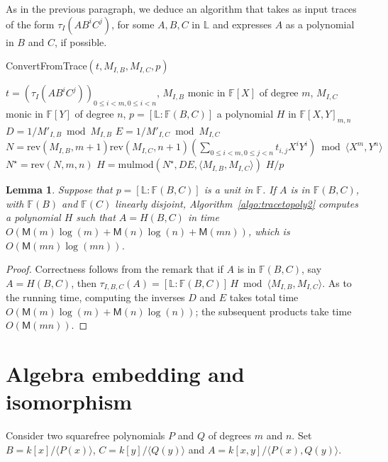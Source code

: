 \documentclass[12pt]{article}
\def\M {\ensuremath{\mathsf{M}}}
\def\F {\ensuremath{\mathbb{F}}}
\def\L {\ensuremath{\mathbb{L}}}
\def\mulmod {\ensuremath{\mathrm{mulmod}}}
\def\rev {\ensuremath{\mathrm{rev}}}
\newcommand{\ang}[1]{\langle#1\rangle}
\newtheorem{Lemma}{Lemma}
\begin{document}
As in the previous paragraph, we deduce an algorithm that takes as
input traces of the form $\tau_I(A B^i C^j)$, for some $A,B,C$ in $\L$
and expresses $A$ as a polynomial in $B$ and $C$, if possible.
\begin{algorithm}[H]
  \caption{ConvertFromTrace$(t, M_{I,B}, M_{I,C}, p)$}
  \begin{algorithmic}[1]
    \REQUIRE  $t=(\tau_I(A B^iC^j))_{0 \le i < m, 0 \le i < n}$, $M_{I,B}$ monic in $\F[X]$ of degree $m$,
    $M_{I,C}$ monic in $\F[Y]$ of degree $n$, 
    $p=[\L:\F(B,C)]$
    \ENSURE a polynomial $H$ in $\F[X,Y]_{m,n}$
    \STATE $D =  1/M'_{I,B} \bmod M_{I,B}$
    \STATE $E =  1/M'_{I,C} \bmod M_{I,C}$
    \STATE $N=\rev(M_{I,B}, m+1)\rev(M_{I,C}, n+1)( \sum_{0 \le i <m, 0 \le j < n} t_{i,j} X^iY^i) \bmod \langle X^m, Y^n \rangle$
    \STATE $N^\star = \rev(N, m, n)$
    \STATE $H=\mulmod(N^\star, D E, \langle M_{I,B}, M_{I,C} \rangle)$
    \RETURN $H/p$
  \end{algorithmic}
  \label{algo:tracetopoly2}
\end{algorithm}

\begin{Lemma}
  Suppose that $p=[\L:\F(B,C)]$ is a unit in $\F$. If $A$ is in
  $\F(B,C)$, with $\F(B)$ and $\F(C)$ linearly disjoint,
  Algorithm~\ref{algo:tracetopoly2} computes a polynomial $H$ such
  that $A=H(B,C)$ in time $O(\M(m)\log(m)+\M(n)\log(n)+\M(mn))$, which
  is $O(\M(mn)\log(mn))$.
\end{Lemma}
\begin{proof}
  Correctness follows from the remark that if $A$ is in $\F(B,C)$, say
  $A=H(B,C)$, then $\tau_{I,B,C} (A)=[\L:\F(B,C)]\, H \bmod \langle
  M_{I,B}, M_{I,C} \rangle$.  As to the running time, computing
  the inverses $D$ and $E$ takes total time $O(\M(m)\log(m)+\M(n)\log(n))$;
  the subsequent products take time $O(\M(mn))$.
\end{proof}


\section{Algebra embedding and isomorphism} 

Consider two squarefree polynomials $P$ and $Q$ of degrees $m$ and
$n$.  Set $B=k[x]/\ang{P(x)}$, $C=k[y]/\ang{Q(y)}$ and
$A=k[x,y]/\ang{P(x),Q(y)}$. 
\end{document}

